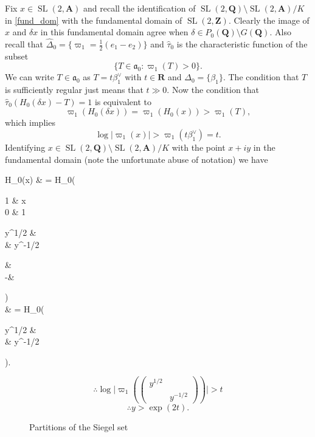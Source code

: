 \documentclass[11pt]{amsart}
\def\A{\mathbf A}
\def\Q{\mathbf Q}
\def\R{\mathbf R}
\def\Z{\mathbf Z}
\def\aaa{\mathfrak a}
\def\cb#1{{\color{blue}#1}}
\def\bs{\setminus} 			%
\def\mod#1{\lvert #1 \rvert} %
\def\sl{\operatorname{SL}}
\theoremstyle{remark}
\begin{document}
\cb{Fix $x \in \sl(2, \A)$ and recall the identification of $\sl(2, \Q)\bs \sl(2, \A) / K$ in \cref{fund_dom} with the fundamental domain of $\sl(2, \Z)$. Clearly the image of $x$ and $\delta x$ in this fundamental domain agree when $\delta \in P_0(\Q) \bs G(\Q)$. 
Also recall that $\hat\Delta_0 = \{\varpi_1 = \frac{1}{2}(e_1 - e_2) \}$ and $\hat \tau_0$ is the characteristic function of the subset 
\[ \{ T \in \aaa_0 : \varpi_1(T) > 0 \}. \]
We can write $T \in \aaa_0$ as $T = t \beta_1^\vee$ with $t \in \R$ and $\Delta_0 = \{\beta_1\}$. The condition that $T$ is sufficiently regular just means that $t \gg 0$. Now the condition that $\hat\tau_0 (H_0(\delta x) - T) = 1$ is equivalent to 
\[ \varpi_1(H_0(\delta x)) = \varpi_1(H_0(x)) > \varpi_1(T), \]
which implies
\[ \log \mod{\varpi_1(x)} > \varpi_1(t \beta_1^\vee) = t. \]
Identifying $x \in \sl(2, \Q)\bs \sl(2, \A) / K$ with the point $x + iy$ in the fundamental domain (note the unfortunate abuse of notation) we have
\begin{flalign*}
	H_0(x) & = H_0(\begin{pmatrix} 1 & x \\ 0 & 1 \end{pmatrix} \begin{pmatrix} y^{1/2} & \\ & y^{-1/2} \end{pmatrix} \begin{pmatrix} \cos \theta & \sin \theta \\ -\sin \theta & \cos \theta \end{pmatrix}) \\
			& = H_0(\begin{pmatrix} y^{1/2} & \\ & y^{-1/2} \end{pmatrix}).
\end{flalign*} 
\[ \therefore \log \mod{\varpi_1(\begin{pmatrix} y^{1/2} & \\ & y^{-1/2} \end{pmatrix})} > t \]
\[ \therefore y > \exp(2t). \]
}

\begin{figure}
\centering
\caption{Partitions of the Siegel set} \label{fig:sd}
\end{figure}
\end{document}

